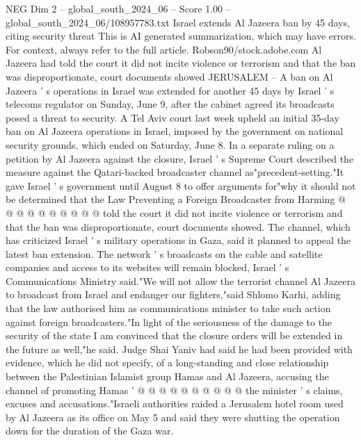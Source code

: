 \begin{textsample}{NEG Dim 2 – global\_south\_2024\_06 – Score 1.00 – global\_south\_2024\_06/108957783.txt}  \label{ex:f2_neg_330}
Israel extends Al Jazeera ban by 45 days, citing security threat This is AI generated summarization, which may have errors.
For context, always refer to the full article.
Robson90/stock.adobe.com Al Jazeera had told the court it did not incite violence or terrorism and that the ban was disproportionate, court documents showed JERUSALEM -- A ban on Al Jazeera ' s operations in Israel was extended for another 45 days by Israel ' s telecoms regulator on Sunday, June 9, after the cabinet agreed its broadcasts posed a threat to security.
A Tel Aviv court last week upheld an initial 35-day ban on Al Jazeera operations in Israel, imposed by the government on national security grounds, which ended on Saturday, June 8.
In a separate ruling on a petition by Al Jazeera against the closure, Israel ' s Supreme Court described the measure against the Qatari-backed broadcaster channel as"precedent-setting."It gave Israel ' s government until August 8 to offer arguments for"why it should not be determined that the Law Preventing a Foreign Broadcaster from Harming @ @ @ @ @ @ @ @ @ @ told the court it did not incite violence or terrorism and that the ban was disproportionate, court documents showed.
The channel, which has criticized Israel ' s military operations in Gaza, said it planned to appeal the latest ban extension.
The network ' s broadcasts on the cable and satellite companies and access to its websites will remain blocked, Israel ' s Communications Ministry said."We will not allow the terrorist channel Al Jazeera to broadcast from Israel and endanger our fighters,"said Shlomo Karhi, adding that the law authorised him as communications minister to take such action against foreign broadcasters."In light of the seriousness of the damage to the security of the state I am convinced that the closure orders will be extended in the future as well,"he said.
Judge Shai Yaniv had said he had been provided with evidence, which he did not specify, of a long-standing and close relationship between the Palestinian Islamist group Hamas and Al Jazeera, accusing the channel of promoting Hamas ' @ @ @ @ @ @ @ @ @ @ the minister ' s claims, excuses and accusations."Israeli authorities raided a Jerusalem hotel room used by Al Jazeera as its office on May 5 and said they were shutting the operation down for the duration of the Gaza war.

\end{textsample}
